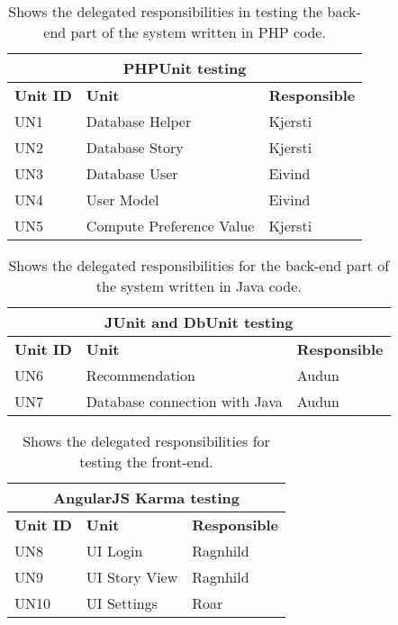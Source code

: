 \begin{table}[H]
	\caption{Shows the delegated responsibilities in testing the back-end part of the system written in PHP code.}
	\label{Tab:phptesting}
	\begin{adjustbox}{center}
		\begin{tabular}{ | l | l | l |}
			\hline
			\multicolumn{3}{|c|}{\textbf{PHPUnit testing}} \\
			\hline
			\textbf{Unit ID} & \textbf{Unit} & \textbf{Responsible} \\ \hline
			UN1 & Database Helper & Kjersti \\ \hline
			UN2 & Database Story & Kjersti \\ \hline
			UN3 & Database User & Eivind \\ \hline
			UN4 & User Model & Eivind \\ \hline			
			UN5 & Compute Preference Value & Kjersti \\ \hline			
		\end{tabular}
	\end{adjustbox}
\end{table}

\begin{table}[H]
		\caption{Shows the delegated responsibilities for the back-end part of the system written in Java code.}
		\label{Tab:junittesting}
	\begin{adjustbox}{center}
		\begin{tabular}{ | l | l | l |}
			\hline
			\multicolumn{3}{|c|}{\textbf{JUnit and DbUnit testing}} \\
			\hline
			\textbf{Unit ID} & \textbf{Unit} & \textbf{Responsible} \\ \hline
			UN6 & Recommendation  & Audun \\ \hline
			UN7 & Database connection with Java & Audun \\\hline			
		\end{tabular}
	\end{adjustbox}

\end{table}

\begin{table}[H]
	\caption{Shows the delegated responsibilities for testing the front-end.}
	\label{Tab:karmatesting}
	\begin{adjustbox}{center}
		\begin{tabular}{ | l | l | l |}
			\hline
			\multicolumn{3}{|c|}{\textbf{AngularJS Karma testing}} \\
			\hline
			\textbf{Unit ID} & \textbf{Unit} & \textbf{Responsible} \\ \hline
			UN8 & UI Login & Ragnhild \\ \hline
			UN9 & UI Story View & Ragnhild \\ \hline
			UN10 & UI Settings & Roar \\ \hline
		\end{tabular}
	\end{adjustbox}

\end{table}


